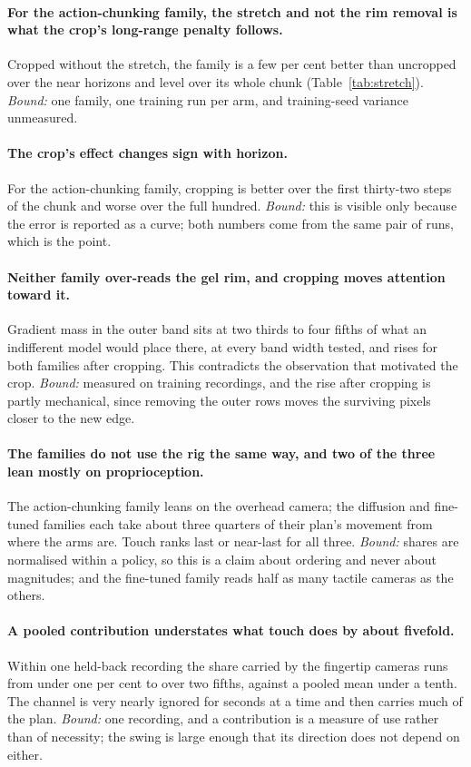 \paragraph{\textbf{For the action-chunking family, the stretch and not the
rim removal is what the crop's long-range penalty follows.}} Cropped without
the stretch, the family is a few per cent better than uncropped over the near
horizons and level over its whole chunk (Table~\ref{tab:stretch}).
\emph{Bound:} one family, one training run per arm, and training-seed
variance unmeasured.

\paragraph{\textbf{The crop's effect changes sign with horizon.}} For the
action-chunking family, cropping is better over the first thirty-two steps of
the chunk and worse over the full hundred. \emph{Bound:} this is visible only
because the error is reported as a curve; both numbers come from the same pair
of runs, which is the point.

\paragraph{\textbf{Neither family over-reads the gel rim, and cropping moves
attention toward it.}} Gradient mass in the outer band sits at two thirds to
four fifths of what an indifferent model would place there, at every band width
tested, and rises for both families after cropping. This contradicts the
observation that motivated the crop. \emph{Bound:} measured on training
recordings, and the rise after cropping is partly mechanical, since removing
the outer rows moves the surviving pixels closer to the new edge.

\paragraph{\textbf{The families do not use the rig the same way, and two of
the three lean mostly on proprioception.}} The action-chunking family leans on
the overhead camera; the diffusion and fine-tuned families each take about
three quarters of their plan's movement from where the arms are. Touch ranks
last or near-last for all three. \emph{Bound:} shares are normalised within a
policy, so this is a claim about ordering and never about magnitudes; and the
fine-tuned family reads half as many tactile cameras as the others.

\paragraph{\textbf{A pooled contribution understates what touch does by about
fivefold.}} Within one held-back recording the share carried by the fingertip
cameras runs from under one per cent to over two fifths, against a pooled mean
under a tenth. The channel is very nearly ignored for seconds at a time and then
carries much of the plan. \emph{Bound:} one recording, and a contribution is a
measure of use rather than of necessity; the swing is large enough that its
direction does not depend on either.


